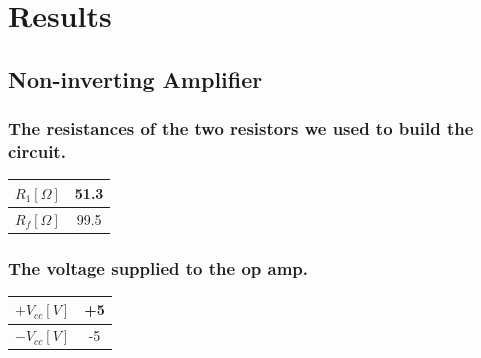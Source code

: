 \documentclass[12pt]{article}
\begin{document}
\section{Results}
\subsection{Non-inverting Amplifier}
\subsubsection{The resistances of the two resistors we used to build the circuit.}
\begin{table}[H]
\centering
\begin{tabular}{|c|c|}
\hline
$R_1[\Omega]$        &51.3      \\ \hline
$R_f[\Omega]$        &99.5    \\ \hline
\end{tabular}
\end{table}
\subsubsection{The voltage supplied to the op amp.}
\begin{table}[H]
\centering
\begin{tabular}{|c|c|}
\hline
$+V_{cc}[V]$       &+5      \\ \hline
$-V_{cc}[V]$        &-5    \\ \hline
\end{tabular}
\end{table}
\end{document}
